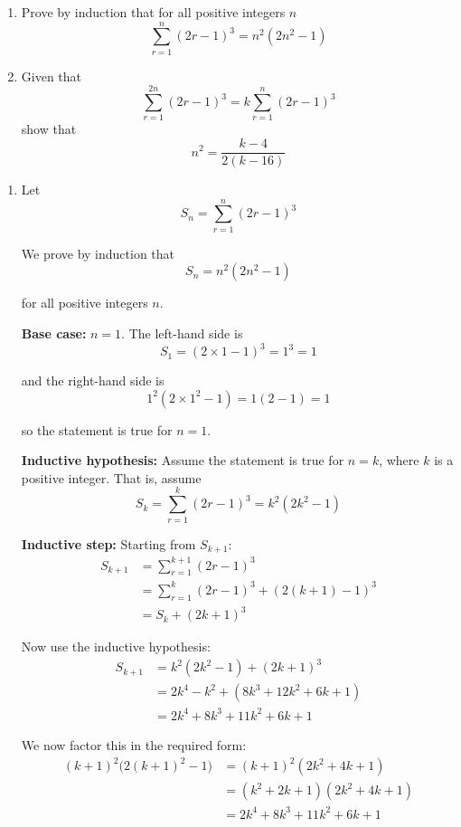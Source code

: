 \documentclass[leqno]{article}
\begin{document}
\begin{enumerate}[
  label=\textbf{\arabic*.},
  leftmargin=*,
  topsep=0pt,
  partopsep=0pt,
  parsep=0pt
]
\begin{enumerate}[label=\textbf{(\alph*)}]
  \item Prove by induction that for all positive integers $n$
  \[
  \sum_{r=1}^{n} (2r-1)^3 = n^2(2n^2-1)
  \]
  \item Given that
  \[
  \sum_{r=1}^{2n} (2r-1)^3 = k\sum_{r=1}^{n} (2r-1)^3
  \]
  show that
  \[
  n^2 = \frac{k-4}{2(k-16)}
  \]
\end{enumerate}

\vspace*{10pt}

\begin{djsSolution}
\begin{enumerate}[label=\textbf{(\alph*)}]
  \item Let
  \[
  S_n=\sum_{r=1}^{n}(2r-1)^3
  \]

  We prove by induction that
  \[
  S_n=n^2(2n^2-1)
  \]

  for all positive integers $n$.

  \textbf{Base case:} $n=1$. The left-hand side is
  \[
  S_1=(2\times1-1)^3=1^3=1
  \]

  and the right-hand side is
  \[
  1^2(2\times1^2-1)=1(2-1)=1
  \]

  so the statement is true for $n=1$.

  \textbf{Inductive hypothesis:} Assume the statement is true for $n=k$, where $k$ is a positive integer. That is, assume
  \[
  S_k=\sum_{r=1}^{k}(2r-1)^3=k^2(2k^2-1)
  \]

  \textbf{Inductive step:} Starting from $S_{k+1}$:
  \begin{align*}
  S_{k+1}
  &=\sum_{r=1}^{k+1}(2r-1)^3 \\
  &=\sum_{r=1}^{k}(2r-1)^3+(2(k+1)-1)^3 \\
  &=S_k+(2k+1)^3
  \end{align*}

  Now use the inductive hypothesis:
  \begin{align*}
  S_{k+1}
  &=k^2(2k^2-1)+(2k+1)^3 \\
  &=2k^4-k^2+(8k^3+12k^2+6k+1) \\
  &=2k^4+8k^3+11k^2+6k+1
  \end{align*}

  We now factor this in the required form:
  \begin{align*}
  (k+1)^2\bigl(2(k+1)^2-1\bigr)
  &=(k+1)^2(2k^2+4k+1) \\
  &=(k^2+2k+1)(2k^2+4k+1) \\
  &=2k^4+8k^3+11k^2+6k+1
  \end{align*}


\end{enumerate}
\end{djsSolution}
\end{enumerate}
\end{document}
